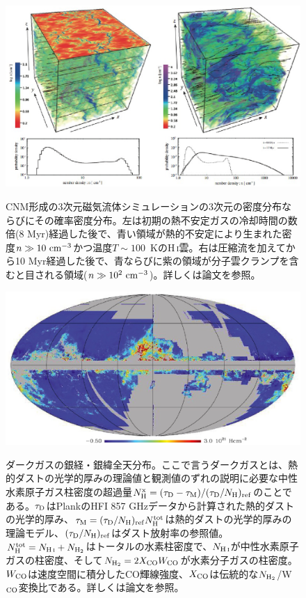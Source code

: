 \begin{figure}[tbp]
\begin{center}
\includegraphics[width=0.8\linewidth]{ISM/c08.s1.ss2.f1.eps}
\caption{
CNM形成の3次元磁気流体シミュレーションの3次元の密度分布ならびにその確率密度分布。左は初期の熱不安定ガスの冷却時間の数倍(8 Myr)経過した後で、青い領域が熱的不安定により生まれた密度$n\gg 10~{\rm cm^{-3}}$かつ温度$T \sim 100$~KのH\,\textsc{i}雲。右は圧縮流を加えてから10 Myr経過した後で、青ならびに紫の領域が分子雲クランプを含むと目される領域($n\gg 10^2~{\rm cm^{-3}}$)。詳しくは論文を参照\citep{2012ApJ...759...35I}。
}\label{c08.s1.ss2.f1}
\includegraphics[width=0.8\linewidth]{ISM/c08.s1.ss2.f2.eps}
\caption{
ダークガスの銀経・銀緯全天分布。ここで言うダークガスとは、熱的ダストの光学的厚みの理論値と観測値のずれの説明に必要な中性水素原子ガス柱密度の超過量$N_{\rm H}^{\rm x}=(\tau_{\rm D}-\tau_{\rm M})/(\tau_{\rm D}/N_{\rm H})_{\rm ref}$のことである。$\tau _{\rm D}$はPlankのHFI 857 GHzデータから計算された熱的ダストの光学的厚み、$\tau _{\rm M}=(\tau_{\rm D}/N_{\rm H})_{\rm ref}N_{\rm H}^{\rm tot}$は熱的ダストの光学的厚みの理論モデル、$(\tau_{\rm D}/N_{\rm H})_{\rm ref}$はダスト放射率の参照値。$N_{\rm H}^{\rm tot}=N_{\rm H\,\textsc{i}}+N_{\rm H_2}$はトータルの水素柱密度で、$N_{\rm H\,\textsc{i}}$が中性水素原子ガスの柱密度、そして$N_{\rm H_2}=2X_{\rm CO}W_{\rm CO}$が水素分子ガスの柱密度。$W_{\rm CO}$は速度空間に積分したCO輝線強度、$X_{\rm CO}$は伝統的な$N_{\rm H_2}$/W$_{\rm CO}$変換比である。詳しくは論文を参照\citep{2011A&A...536A..19P}。
}\label{c08.s1.ss2.f2}
\end{center}
\end{figure}

